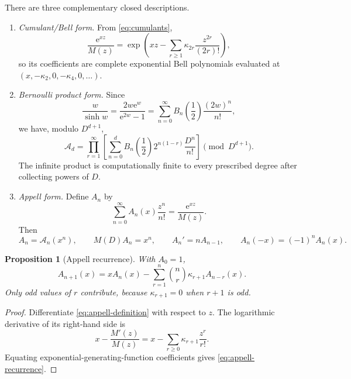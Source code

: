 \documentclass[11pt,oneside]{book}
\newtheorem{proposition}[theorem]{Proposition}
\theoremstyle{definition}
\theoremstyle{remark}
\newcommand{\Aop}{\mathcal A}
\newcommand{\e}{\mathrm e}
\begin{document}
There are three complementary closed descriptions.
\begin{enumerate}
\item \emph{Cumulant/Bell form.}  From \cref{eq:cumulants},
\begin{equation}
 \frac{\e^{xz}}{M(z)}
 =\exp\!\left(xz-\sum_{r\ge1}\kappa_{2r}\frac{z^{2r}}{(2r)!}\right),
 \label{eq:appell-bell-generating}
\end{equation}
so its coefficients are complete exponential Bell polynomials evaluated at
\((x,-\kappa_2,0,-\kappa_4,0,\ldots)\).

\item \emph{Bernoulli product form.}  Since
\[
 \frac{w}{\sinh w}=\frac{2w\e^w}{\e^{2w}-1}
 =\sum_{n=0}^{\infty}B_n\!\left(\frac12\right)\frac{(2w)^n}{n!},
\]
we have, modulo \(D^{d+1}\),
\begin{equation}
 \Aop_d=
 \prod_{r=1}^{\infty}
 \left[
   \sum_{n=0}^{d}B_n\!\left(\frac12\right)
   2^{n(1-r)}\frac{D^n}{n!}
 \right]\pmod{D^{d+1}}.
 \label{eq:bernoulli-product-operator}
\end{equation}
The infinite product is computationally finite to every prescribed degree after collecting powers of \(D\).

\item \emph{Appell form.}  Define \(A_n\) by
\begin{equation}
 \sum_{n=0}^{\infty}A_n(x)\frac{z^n}{n!}
 =\frac{\e^{xz}}{M(z)}.
 \label{eq:appell-definition}
\end{equation}
Then
\begin{equation}
 A_n=\Aop_n(x^n),\qquad M(D)A_n=x^n,
 \qquad A_n'=nA_{n-1},
 \qquad A_n(-x)=(-1)^nA_n(x).
 \label{eq:appell-properties}
\end{equation}
\end{enumerate}

\begin{proposition}[Appell recurrence]
\label{prop:appell-recurrence}
With \(A_0=1\),
\begin{equation}
 A_{n+1}(x)=xA_n(x)-
 \sum_{r=1}^{n}\binom nr\kappa_{r+1}A_{n-r}(x).
 \label{eq:appell-recurrence}
\end{equation}
Only odd values of \(r\) contribute, because \(\kappa_{r+1}=0\) when \(r+1\) is odd.
\end{proposition}

\begin{proof}
Differentiate \cref{eq:appell-definition} with respect to \(z\).  The logarithmic derivative of its right-hand side is
\[
 x-\frac{M'(z)}{M(z)}
 =x-\sum_{r\ge0}\kappa_{r+1}\frac{z^r}{r!}.
\]
Equating exponential-generating-function coefficients gives \cref{eq:appell-recurrence}.
\end{proof}
\end{document}
